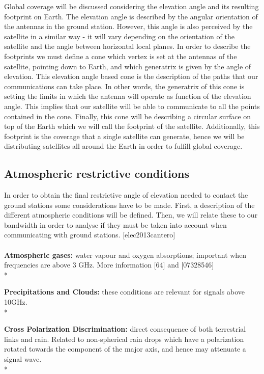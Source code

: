 Global coverage will be discussed considering the elevation angle and its resulting footprint on Earth. The elevation angle is described by the angular orientation of the antennas in the ground station. However, this angle is also perceived by the satellite in a similar way - it will vary depending on the orientation of the satellite and the angle between horizontal local planes. In order to describe the footprints we must define a cone which vertex is set at the antennas of the satellite, pointing down to Earth, and which generatrix is given by the angle of elevation. This elevation angle based cone is the description of the paths that our communications can take place. In other words, the generatrix of this cone is setting the limits in which the antenna will operate as function of the elevation angle. This implies that our satellite will be able to communicate to all the points contained in the cone. Finally, this cone will be describing a circular surface on top of the Earth which we will call the footprint of the satellite. Additionally, this footprint is the coverage that a single satellite can generate, hence we will be distributing satellites all around the Earth in order to fulfill global coverage. 



\subsection{Atmospheric restrictive conditions}
In order to obtain the final restrictive angle of elevation needed to contact the ground stations some considerations have to be made. First, a description of the different atmospheric conditions will be defined. Then, we will relate these to our bandwidth in order to analyse if they must be taken into account when communicating with ground stations. [elec2013cantero]
\paragraph{    }
\textendash\textbf{ Atmospheric gases: }water vapour and oxygen absorptions; important when frequencies are above 3 GHz. More information [64] and [07328546]\\*

\textendash\textbf{ Precipitations and Clouds: }these conditions are relevant for signals above 10GHz. \\*

\textendash\textbf{ Cross Polarization Discrimination: }direct consequence of both terrestrial links and rain. Related to non-spherical rain drops which have a polarization rotated towards the component of the major axis, and hence may attenuate a signal wave. \\*


